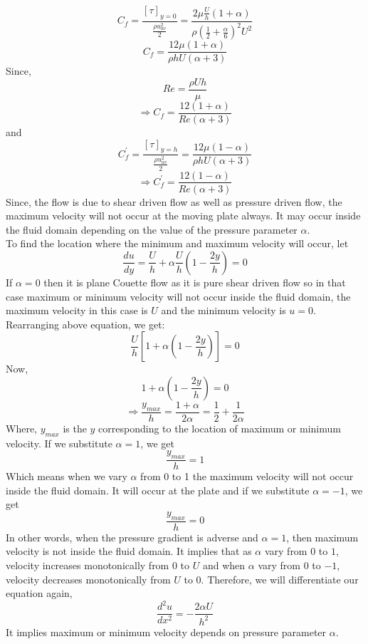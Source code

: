 \documentclass[14pt,one side, a4paper]{extbook}
\begin{document}
	 	\begin{equation}
	 		{C_{f}=\frac{\left[\tau\right]_{y=0}}{\frac{\rho u_{av}^{2}}{2}}=\frac{2\mu \frac{U}{h}\left(1+\alpha\right)}{\rho\left(\frac{1}{2}+\frac{\alpha}{6}\right)^{2}U^{2}}}
	 	\end{equation}
	 	$$C_{f}=\frac{12\mu\left(1+\alpha\right)}{\rho hU\left(\alpha+3\right)}$$
	 	Since, $$Re=\frac{\rho Uh}{\mu}$$
	 	$$\Longrightarrow C_{f}=\frac{12\left(1+\alpha\right)}{Re\left(\alpha+3\right)}$$ 
	 	and 
	 	\begin{equation}
	 		{C_{f}^{'}}=\frac{\left[\tau\right]_{y=h}}{\frac{\rho u_{av}^{2}}{2}}=\frac{12\mu\left(1-\alpha\right)}{\rho hU\left(\alpha+3\right)}
	 	\end{equation}
	 	$$\Longrightarrow C_{f}^{'}=\frac{12\left(1-\alpha\right)}{Re\left(\alpha+3\right)}$$
	 	Since, the flow is due to shear driven flow as well as pressure driven flow, the maximum velocity will not occur at the moving plate always. 
	 	It may occur inside the fluid domain depending on the value of the pressure parameter $\alpha$.
	 	\\To find the location where the minimum and maximum velocity will occur, let$$\frac{du}{dy}=\frac{U}{h}+\alpha \frac{U}{h}\left(1-\frac{2y}{h}\right)=0$$ 
	 	If $\alpha=0$ then it is plane Couette flow as it is pure shear driven flow so in that case maximum or minimum velocity will not occur inside the fluid domain, the maximum velocity in this case is $U$ and the minimum velocity is $u = 0$. 
	 	Rearranging above equation, we get:$$\frac{U}{h}\left[1+\alpha\left(1-\frac{2y}{h}\right)\right]=0$$ 
	 	Now, $$1+\alpha\left(1-\frac{2y}{h}\right)=0$$
	 	$$\Longrightarrow \frac{y_{max}}{h}=\frac{1+\alpha}{2\alpha}=\frac{1}{2}+\frac{1}{2\alpha}$$
	 	Where, $y_{max}$ is the $y$ corresponding to the location of maximum or minimum velocity. If we substitute $\alpha=1$, we get $$\frac{y_{max}}{h}=1$$ Which means when we vary $\alpha$ from 0 to 1 the maximum velocity will not occur inside the fluid domain. It will occur at the plate and if we substitute $\alpha=-1$, we get $$\frac{y_{max}}{h}=0$$ 
	 	In other words, when the pressure gradient is adverse and $\alpha=1$, then maximum velocity is not inside the fluid domain. It implies that as $\alpha$ vary from $0$ to $1$, velocity increases monotonically from $0$ to $U$ and when $\alpha$ vary from $0$ to $-1$, velocity decreases monotonically from $U$ to $0$.
	 	Therefore, we will differentiate our equation again,
	 	$$\frac{d^{2}u}{dx^{2}}=-\frac{2\alpha U}{h^{2}}$$ 
	 	It implies maximum or minimum velocity depends on pressure parameter $\alpha$. 
\end{document}
